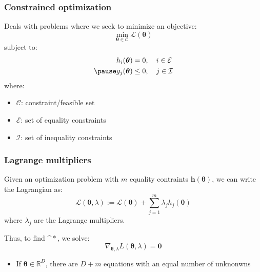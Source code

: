 \documentclass[smaller]{beamer}
\newcommand{\?}{\stackrel{?}{=}}
\newcommand{\la}{\lambda}
\renewcommand{\th}{\theta}
\newcommand{\mb}{\mathbb}
\newcommand{\mc}{\mathcal}
\newcommand{\pe}{\pause}
\begin{document}
\begin{frame}
  \frametitle{Constrained optimization}
  \pe
  Deals with problems where we seek to minimize an objective:\pe
  \begin{equation}
    \min_{\bm\th\in\mc{C}}\mc{L}(\bm\th)
  \end{equation}\pe
  subject to:\pe
  \begin{align}
    h_i(\bm\th) &= 0, \quad i\in\mc{E}\\\pe
    g_j(\bm\th) &\le 0, \quad j\in\mc{I}
  \end{align}
  \pe
  where:
  \begin{itemize}
  \item $\mc{C}$: constraint/feasible set\pe
  \item $\mc{E}$: set of equality constraints \pe
  \item $\mc{I}$: set of inequality constraints
  \end{itemize}
\end{frame}


\begin{frame}
  \frametitle{Lagrange multipliers}
  \pe Given an optimization problem with $m$ equality contraints $\bm h(\bm\th)$, we can write the Lagrangian as:\pe
  \begin{equation}
    \mc L(\bm\th,\la) := \mc{L}(\bm\th) + \sum_{j=1}^m \la_jh_j(\bm\th)
  \end{equation}
  \pe
  where $\la_j$ are the Lagrange multipliers. \pe
  
  Thus, to find $\bm^*$, we solve:\pe
  \begin{equation}
    \nabla_{\bm\th,\la}L(\bm\th, \la) = \bm0
  \end{equation}
  \pe
  \begin{itemize}
  \item If $\bm\th \in \mb{R}^D$, there are $D+m$ equations with an equal number of unknonwns
  \end{itemize}
\end{frame}
\end{document}
